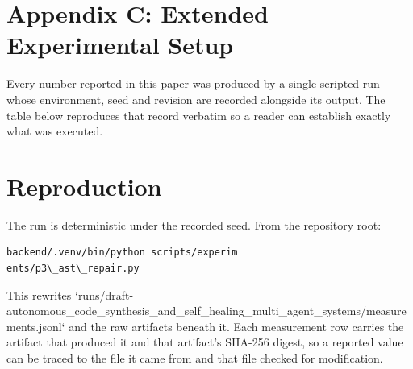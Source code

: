 \documentclass[10pt,journal,compsoc,twocolumn]{IEEEtran}
\begin{document}
\section{Appendix C: Extended Experimental Setup}


Every number reported in this paper was produced by a single scripted run whose environment, seed and revision are recorded alongside its output. The table below reproduces that record verbatim so a reader can establish exactly what was executed.
\begin{table}[htbp]
\centering
{}
\end{table}


\section{Reproduction}


The run is deterministic under the recorded seed. From the repository root:


\begin{scriptsize}
\begin{verbatim}
backend/.venv/bin/python scripts/experim
ents/p3\_ast\_repair.py
\end{verbatim}
\end{scriptsize}


This rewrites `runs/draft-autonomous\_code\_synthesis\_and\_self\_healing\_multi\_agent\_systems/measurements.jsonl` and the raw artifacts beneath it. Each measurement row carries the artifact that produced it and that artifact's SHA-256 digest, so a reported value can be traced to the file it came from and that file checked for modification.
\end{document}
